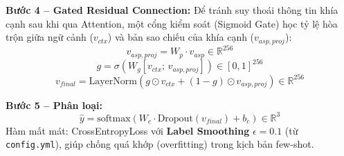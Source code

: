\documentclass[12pt,a4paper,oneside]{report}
\begin{document}
\textbf{Bước 4 -- Gated Residual Connection:}
Để tránh suy thoái thông tin khía cạnh sau khi qua Attention, một cổng kiểm soát (Sigmoid Gate) học tỷ lệ hòa trộn giữa ngữ cảnh ($v_{ctx}$) và bản sao chiếu của khía cạnh ($v_{asp,proj}$):
\begin{equation}
    v_{asp,proj} = W_p \cdot v_{asp} \in \mathbb{R}^{256}
\end{equation}
\begin{equation}
    g = \sigma\!\left(W_g [v_{ctx};\, v_{asp,proj}]\right) \in [0,1]^{256}
\end{equation}
\begin{equation}
    v_{final} = \text{LayerNorm}\!\left(g \odot v_{ctx} + (1-g) \odot v_{asp,proj}\right) \in \mathbb{R}^{256}
\end{equation}

\textbf{Bước 5 -- Phân loại:}
\begin{equation}
    \hat{y} = \text{softmax}(W_c \cdot \text{Dropout}(v_{final}) + b_c) \in \mathbb{R}^3
\end{equation}
Hàm mất mát: CrossEntropyLoss với \textbf{Label Smoothing} $\epsilon = 0.1$ (từ \texttt{config.yml}), giúp chống quá khớp (overfitting) trong kịch bản few-shot.
\end{document}
